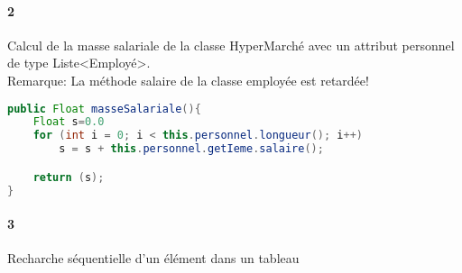 \paragraph{2}Calcul de la masse salariale de la classe HyperMarché avec un attribut personnel de type Liste<Employé>.\\
Remarque: La méthode salaire de la classe employée est retardée!
\begin{lstlisting}[language=java, caption=Dans supermarché]
public Float masseSalariale(){
	Float s=0.0
	for (int i = 0; i < this.personnel.longueur(); i++)
		s = s + this.personnel.getIeme.salaire();

	return (s);
}
\end{lstlisting}

\paragraph{3}Recharche séquentielle d'un élément dans un tableau

